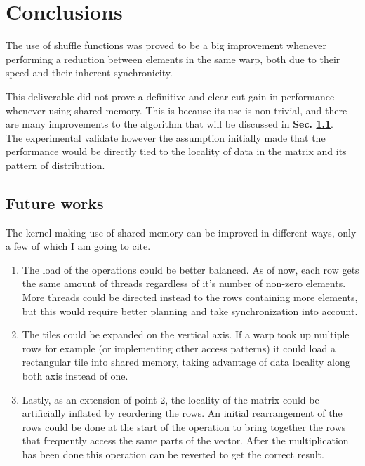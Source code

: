 \documentclass[conference]{IEEEtran}
\begin{document}
\section{Conclusions}
The use of shuffle functions was proved to be a big improvement whenever performing a reduction between elements in the same warp, both due to their speed and their inherent synchronicity.

This deliverable did not prove a definitive and clear-cut gain in performance whenever using shared memory. This is because its use is non-trivial, and there are many improvements to the algorithm that will be discussed in \textbf{Sec. \ref{sec:future_works}}.\\
The experimental validate however the assumption initially made that the performance would be directly tied to the locality of data in the matrix and its pattern of distribution.

\subsection{Future works}\label{sec:future_works}
The kernel making use of shared memory can be improved in different ways, only a few of which I am going to cite.
\begin{enumerate}
    \item The load of the operations could be better balanced. As of now, each row gets the same amount of threads regardless of it's number of non-zero elements. More threads could be directed instead to the rows containing more elements, but this would require better planning and take synchronization into account.
    \item The tiles could be expanded on the vertical axis. If a warp took up multiple rows for example (or implementing other access patterns) it could load a rectangular tile into shared memory, taking advantage of data locality along both axis instead of one.
    \item Lastly, as an extension of point 2, the locality of the matrix could be artificially inflated by reordering the rows. An initial rearrangement of the rows could be done at the start of the operation to bring together the rows that frequently access the same parts of the vector. After the multiplication has been done this operation can be reverted to get the correct result.
\end{enumerate}



\end{document}
